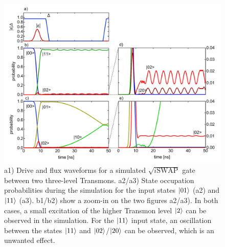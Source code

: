 \begin{figure}[ht!]
	\centering
	\includegraphics[width=\textwidth]{./data/simulation/three_level_swap/plots}
	\caption{a1) Drive and flux waveforms for a simulated $\sqrt{i\mathrm{SWAP}}$ gate between two three-level Transmons. a2/a3) State occupation probabilities during the simulation for the input states $\left| 01 \right>$ (a2) and $\left| 11 \right>$ (a3). b1/b2) show a zoom-in on the two figures a2/a3). In both cases, a small excitation of the higher Transmon level $\left| 2 \right>$ can be observed in the simulation. For the $\left| 11 \right>$ input state, an oscillation between the states $\left| 11 \right>$ and $\left| 02 \right>$/$\left| 20 \right>$ can be observed, which is an unwanted effect. }
	\label{fig:swap_3_level_data}
\end{figure}

